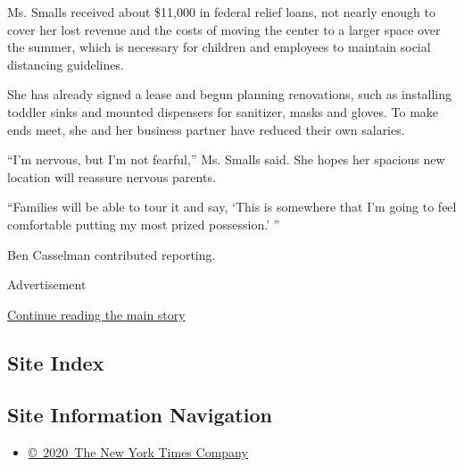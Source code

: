 Ms. Smalls received about \$11,000 in federal relief loans, not nearly
enough to cover her lost revenue and the costs of moving the center to a
larger space over the summer, which is necessary for children and
employees to maintain social distancing guidelines.

She has already signed a lease and begun planning renovations, such as
installing toddler sinks and mounted dispensers for sanitizer, masks and
gloves. To make ends meet, she and her business partner have reduced
their own salaries.

``I'm nervous, but I'm not fearful,'' Ms. Smalls said. She hopes her
spacious new location will reassure nervous parents.

``Families will be able to tour it and say, `This is somewhere that I'm
going to feel comfortable putting my most prized possession.' ''

Ben Casselman contributed reporting.

Advertisement

\protect\hyperlink{after-bottom}{Continue reading the main story}

\hypertarget{site-index}{%
\subsection{Site Index}\label{site-index}}

\hypertarget{site-information-navigation}{%
\subsection{Site Information
Navigation}\label{site-information-navigation}}

\begin{itemize}
\tightlist
\item
  \href{https://help.nytimes3xbfgragh.onion/hc/en-us/articles/115014792127-Copyright-notice}{©~2020~The
  New York Times Company}
\end{itemize}

